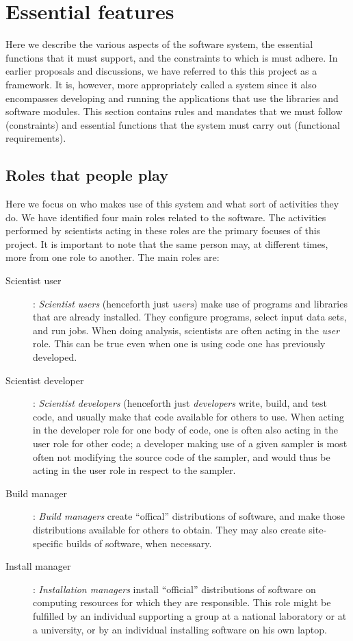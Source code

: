 \documentclass[draftmode,draftwater]{memarticle}
\newcommand{\cosmosis}{\name{CosmoSIS}\xspace}
\begin{document}
\chapter{Essential features}

Here we describe the various aspects of the software
system, the essential functions that it must support, and the
constraints to which is must adhere. In earlier proposals and
discussions, we have referred to this this project as a framework. It
is, however, more appropriately called a system since it also encompasses
developing and running the applications that use the libraries and
software modules. This section contains rules and mandates that we
must follow (constraints) and essential functions that the system must
carry out (functional requirements).

\section{Roles that people play}

Here we focus on who makes use of this system and what sort of
activities they do. We have identified four main roles related to the
\cosmosis software. The activities performed by scientists acting in
these roles are the primary focuses of this project. It is important to
note that the same person may, at different times, more from one role to
another. The main roles are:
\begin{description}

\item[Scientist user]: \emph{Scientist users} (henceforth just
  \emph{users}) make use of programs and libraries that are already
  installed. They configure programs, select input data sets, and run
  jobs. When doing analysis, scientists are often acting in the
  \emph{user} role. This can be true even when one is using code one has
  previously developed.

\item[Scientist developer]: \emph{Scientist developers} (henceforth just
  \emph{developers} write, build, and test code, and usually make that
  code available for others to use. When acting in the developer role
  for one body of code, one is often also acting in the user role for
  other code; \eg a developer making use of a given sampler is most
  often not modifying the source code of the sampler, and would thus be
  acting in the user role in respect to the sampler.

\item[Build manager]: \emph{Build managers} create ``offical''
  distributions of software, and make those distributions available for
  others to obtain. They may also create site-specific builds of
  software, when necessary.

\item[Install manager]: \emph{Installation managers} install
  ``official'' distributions of software on computing resources for
  which they are responsible. This role might be fulfilled by an
  individual supporting a group at a national laboratory or at a
  university, or by an individual installing software on his own laptop.

\end{description}
\end{document}
